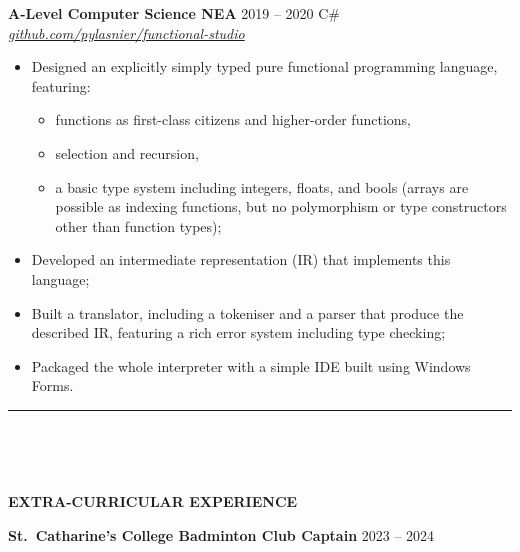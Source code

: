 \documentclass[
  11pt,
  a4paper,
]{article}
\providecommand{\tightlist}{%
  \setlength{\itemsep}{0pt}\setlength{\parskip}{0pt}}
\newcommand{\itemspace}{0.8ex}
\newcommand{\ruledheader}[2]{%
\begingroup
\setlength{\fboxsep}{0pt}%
\colorbox{#1}{%
\parbox[b][1.2ex][t]{35mm}{\begin{tiny}\ \end{tiny}}}%
\parbox[b][1.2ex][t]{5mm}{\begin{tiny}\ \end{tiny}}%
\uppercase{\textbf{#2}}
\endgroup}
\begin{document}
\pagebreak

\vspace{\itemspace}

\textbf{A-Level Computer Science NEA} \textbar{} 2019 – 2020 \textbar{}
C\# \textbar{}
\href{https://github.com/pylasnier/functional-studio}{\emph{github.com/pylasnier/functional-studio}}

\begin{itemize}
\tightlist
\item
  Designed an explicitly simply typed pure functional programming
  language, featuring:

  \begin{itemize}
  \tightlist
  \item
    functions as first-class citizens and higher-order functions,
  \item
    selection and recursion,
  \item
    a basic type system including integers, floats, and bools (arrays
    are possible as indexing functions, but no polymorphism or type
    constructors other than function types);
  \end{itemize}
\item
  Developed an intermediate representation (IR) that implements this
  language;
\item
  Built a translator, including a tokeniser and a parser that produce
  the described IR, featuring a rich error system including type
  checking;
\item
  Packaged the whole interpreter with a simple IDE built using Windows
  Forms.
\end{itemize}

\begin{Large}

\vspace{-1.5ex}\rule{\textwidth}{0.8pt}\vspace{2ex}

\ruledheader{cyan!50!teal}{Extra-curricular experience}\end{Large}

\vspace{\itemspace}

\textbf{St.~Catharine’s College Badminton Club Captain} \textbar{} 2023
– 2024
\end{document}
